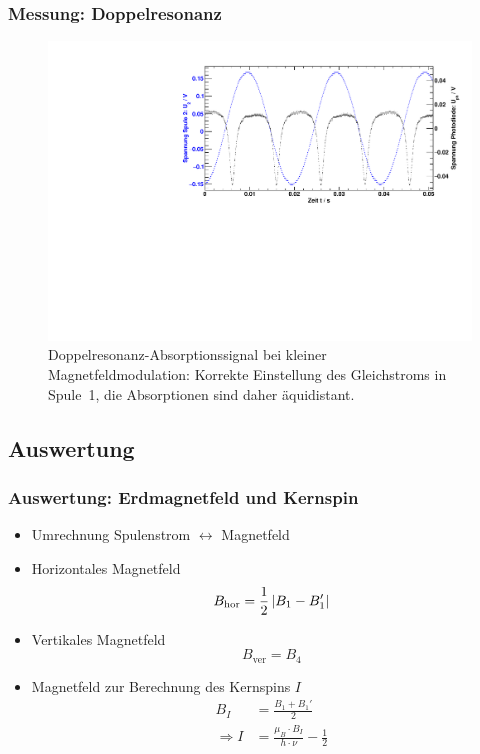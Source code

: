 \begin{frame}
\frametitle{Messung: Doppelresonanz}
\begin{figure}
    \begin{center}
        \includegraphics[width=\textwidth]{../img/08.pdf}
        \caption{Doppelresonanz-Absorptionssignal bei kleiner Magnetfeldmodulation:
        Korrekte Einstellung des Gleichstroms in Spule~1,
        die Absorptionen sind daher äquidistant.}
        \label{img:rfcorrect}
    \end{center}
\end{figure}
\end{frame}



\subsection{Auswertung}
\begin{frame}
\frametitle{Auswertung: Erdmagnetfeld und Kernspin}
\begin{itemize}[<+->]
    \item Umrechnung Spulenstrom $\leftrightarrow$ Magnetfeld
    \item Horizontales Magnetfeld
    \begin{equation*}
        B_\text{hor} = \frac{1}{2} \left|B_1 - B_1'\right|
    \end{equation*}
    \item Vertikales Magnetfeld
    \begin{equation*}
        B_\text{ver} = B_4
    \end{equation*}
    \item Magnetfeld zur Berechnung des Kernspins $I$
    \begin{equation*}
        \begin{split}
            B_I &= \frac{B_1 + B_1'}{2} \\
            \Rightarrow I &= \frac{\mu_B \cdot B_I}{h \cdot \nu} - \frac{1}{2}
        \end{split}
    \end{equation*}
\end{itemize}
\end{frame}



